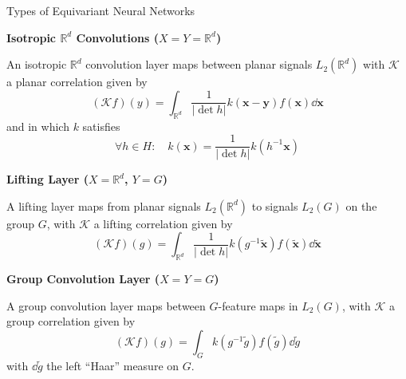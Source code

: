 \documentclass[9pt,dvipsnames]{beamer}
\begin{document}
\begin{frame}{Types of Equivariant Neural Networks}

	\textbf{Isotropic $\mathbb{R}^d$ Convolutions ($X = Y = \mathbb{R}^d$)}

	An isotropic $\mathbb{R}^d$ convolution layer maps between planar signals $L_2(\mathbb{R}^d)$ with $\mathcal{K}$ a planar correlation given by
	\begin{equation}
		(\mathcal{K}f)(y) = \int_{\mathbb{R}^d} \frac{1}{|\det h|} k(\mathbf{x} - \mathbf{y}) f(\mathbf{x}) \dd\mathbf{x}
	\end{equation}
	and in which $k$ satisfies
	\begin{equation*}
		\forall h \in H : \quad k(\mathbf{x}) = \frac{1}{|\det h|} k(h^{-1} \mathbf{x})
	\end{equation*}

	\textbf{Lifting Layer ($X = \mathbb{R}^d$, $Y = G$)}

	A lifting layer maps from planar signals $L_2(\mathbb{R}^d)$ to signals $L_2(G)$ on the group $G$, with $\mathcal{K}$ a lifting correlation given by
	\begin{equation}
		(\mathcal{K}f)(g) = \int_{\mathbb{R}^d} \frac{1}{|\det h|} k(g^{-1}\tilde{\mathbf{x}}) f(\tilde{\mathbf{x}}) \dd\tilde{\mathbf{x}}
	\end{equation}

	\textbf{Group Convolution Layer ($X = Y = G$)}

	A group convolution layer maps between $G$-feature maps in $L_2(G)$, with $\mathcal{K}$ a group correlation given by
	\begin{equation}
		(\mathcal{K}f)(g) = \int_G k(g^{-1}\tilde{g}) f(\tilde{g}) \dd\tilde{g}
	\end{equation}
	with $\dd\tilde{g}$ the left ``Haar'' measure on $G$.

\end{frame}
\end{document}
